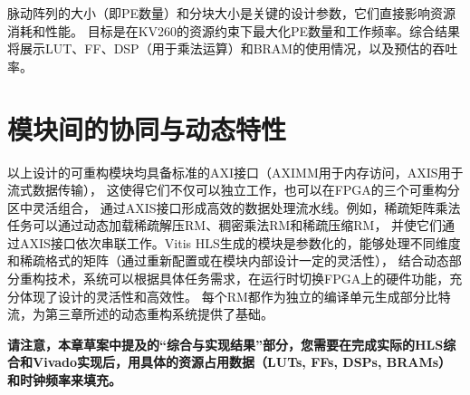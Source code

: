 脉动阵列的大小（即PE数量）和分块大小是关键的设计参数，它们直接影响资源消耗和性能。
目标是在KV260的资源约束下最大化PE数量和工作频率。综合结果将展示LUT、FF、DSP（用于乘法运算）和BRAM的使用情况，以及预估的吞吐率。

\section{模块间的协同与动态特性}

以上设计的可重构模块均具备标准的AXI接口（AXIMM用于内存访问，AXIS用于流式数据传输），
这使得它们不仅可以独立工作，也可以在FPGA的三个可重构分区中灵活组合，
通过AXIS接口形成高效的数据处理流水线。例如，稀疏矩阵乘法任务可以通过动态加载稀疏解压RM、稠密乘法RM和稀疏压缩RM，
并使它们通过AXIS接口依次串联工作。Vitis HLS生成的模块是参数化的，能够处理不同维度和稀疏格式的矩阵（通过重新配置或在模块内部设计一定的灵活性），
结合动态部分重构技术，系统可以根据具体任务需求，在运行时切换FPGA上的硬件功能，充分体现了设计的灵活性和高效性。
每个RM都作为独立的编译单元生成部分比特流，为第三章所述的动态重构系统提供了基础。

\textbf{请注意，本章草案中提及的“综合与实现结果”部分，您需要在完成实际的HLS综合和Vivado实现后，用具体的资源占用数据（LUTs, FFs, DSPs, BRAMs）和时钟频率来填充。}
